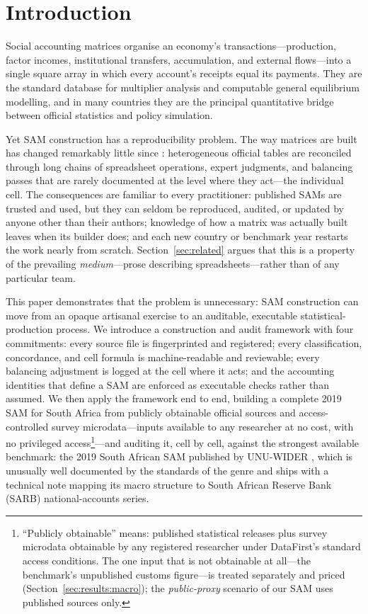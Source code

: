 \section{Introduction}\label{sec:intro}

Social accounting matrices organise an economy's transactions---production,
factor incomes, institutional transfers, accumulation, and external
flows---into a single square array in which every account's receipts equal
its payments. They are the standard database for multiplier analysis and
computable general equilibrium modelling, and in many countries they are the
principal quantitative bridge between official statistics and policy
simulation.

Yet SAM construction has a reproducibility problem. The way matrices are
built has changed remarkably little since \citet{pyattround1985}:
heterogeneous official tables are reconciled through long chains of
spreadsheet operations, expert judgments, and balancing passes that are
rarely documented at the level where they act---the individual cell. The
consequences are familiar to every practitioner: published SAMs are trusted
and used, but they can seldom be reproduced, audited, or updated by anyone
other than their authors; knowledge of how a matrix was actually built
leaves when its builder does; and each new country or benchmark year
restarts the work nearly from scratch. Section~\ref{sec:related} argues
that this is a property of the prevailing \emph{medium}---prose describing
spreadsheets---rather than of any particular team.

This paper demonstrates that the problem is unnecessary: SAM construction
can move from an opaque artisanal exercise to an auditable, executable
statistical-production process. We introduce a construction and audit
framework with four commitments: every source file is fingerprinted and
registered; every classification, concordance, and cell formula is
machine-readable and reviewable; every balancing adjustment is logged at
the cell where it acts; and the accounting identities that define a SAM
are enforced as executable checks rather than assumed. We then apply the
framework end to end, building a complete 2019 SAM for South Africa from
publicly obtainable official sources and access-controlled survey
microdata---inputs available to any researcher at no cost, with no
privileged access\footnote{``Publicly obtainable'' means: published
statistical releases plus survey microdata obtainable by any registered
researcher under DataFirst's standard access conditions. The one input
that is not obtainable at all---the benchmark's unpublished customs
figure---is treated separately and priced
(Section~\ref{sec:results:macro}); the \emph{public-proxy} scenario of
our SAM uses published sources only.}---and auditing it, cell by cell,
against the strongest available benchmark: the 2019 South African SAM
published by UNU-WIDER \citep{vanseventer2023}, which is unusually well
documented by the standards of the genre and ships with a technical note
mapping its macro structure to South African Reserve Bank (SARB)
national-accounts series.

